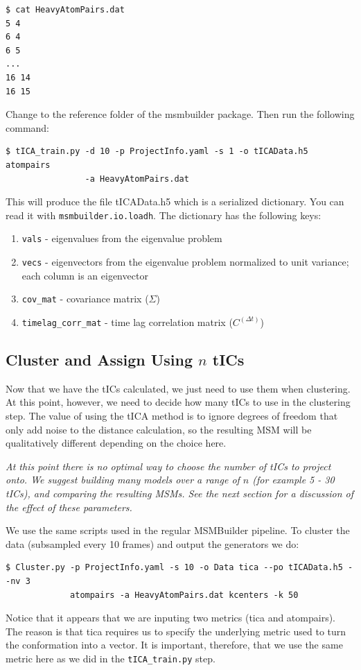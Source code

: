 \documentclass[12pt]{article}
\begin{document}
\begin{verbatim}
$ cat HeavyAtomPairs.dat
5 4
6 4
6 5
...
16 14
16 15
\end{verbatim}
Change to the reference folder of the msmbuilder package. Then run the following command:
\begin{verbatim}
$ tICA_train.py -d 10 -p ProjectInfo.yaml -s 1 -o tICAData.h5 atompairs 
                -a HeavyAtomPairs.dat
\end{verbatim} This will produce the file tICAData.h5 which is a serialized dictionary. You can read it with \texttt{msmbuilder.io.loadh}. The dictionary has the following keys:
\begin{enumerate}
\item \texttt{vals} - eigenvalues from the eigenvalue problem
\item \texttt{vecs} - eigenvectors from the eigenvalue problem normalized to unit variance; each column is an eigenvector
\item \texttt{cov\_mat} - covariance matrix ($\Sigma$)
\item \texttt{timelag\_corr\_mat} - time lag correlation matrix ($C^{(\Delta t)}$)
\end{enumerate} 

\subsection{Cluster and Assign Using $n$ tICs}
Now that we have the tICs calculated, we just need to use them when clustering. At this point, however, we need to decide how many tICs to use in the clustering step. The value of using the tICA method is to ignore degrees of freedom that only add noise to the distance calculation, so the resulting MSM will be qualitatively different depending on the choice here. 

{\it At this point there is no optimal way to choose the number of tICs to project onto. We suggest building many models over a range of $n$ (for example 5 - 30 tICs), and comparing the resulting MSMs. See the next section for a discussion of the effect of these parameters.}

We use the same scripts used in the regular MSMBuilder pipeline. To cluster the data (subsampled every 10 frames) and output the generators we do:
\begin{verbatim}
$ Cluster.py -p ProjectInfo.yaml -s 10 -o Data tica --po tICAData.h5 --nv 3 
             atompairs -a HeavyAtomPairs.dat kcenters -k 50
\end{verbatim} Notice that it appears that we are inputing two metrics (tica and atompairs). The reason is that tica requires us to specify the underlying metric used to turn the conformation into a vector. It is important, therefore, that we use the same metric here as we did in the \texttt{tICA\_train.py} step.
\end{document}
